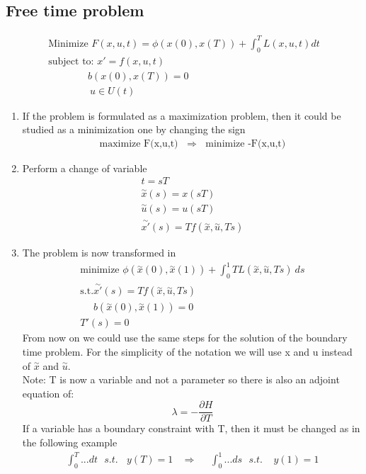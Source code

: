 \documentclass[a4paper,12pt]{article}
\begin{document}
	\subsection{Free time problem}
	\begin{gather*}
		\text{Minimize } F(x,u,t)=\phi(x(0),x(T))+\int_{0}^{T}L(x,u,t)dt\\
		\text{subject to: } x'=f(x,u,t)\\
		\ \ \ \ \ \ \ \ \ \ \ \ \ \ \ \ \ \ b(x(0),x(T))=0\\
		\ \ \ \ \ \ \ \ \ \ \ \ \ \ \ \ \ \ \ u \in U(t)
	\end{gather*}
	\begin{enumerate}
		\item If the problem is formulated as a maximization problem, then it could be studied as a minimization one by changing the sign
		\begin{gather*}
			\text{maximize F(x,u,t)} \ \ \ \  \Rightarrow \ \ \ \ \text{minimize -F(x,u,t)}
		\end{gather*}
		\item Perform a change of variable
		\begin{gather*}
			t=sT\\
			\stackrel{\sim}{x}(s)=x(sT)\\
			\stackrel{\sim}{u}(s)=u(sT)\\
			\stackrel{\sim}{x'}(s)=Tf(\stackrel{\sim}{x},\stackrel{\sim}{u},Ts)
		\end{gather*}
		\item The problem is now transformed in
		\begin{gather*}
			\text{minimize } \phi(\stackrel{\sim}{x}(0),\stackrel{\sim}{x}(1)) +\int_{0}^{1} T L(\stackrel{\sim}{x},\stackrel{\sim}{u},Ts) \ ds \\
			\text{s.t.} \stackrel{\sim}{x'}(s)=Tf(\stackrel{\sim}{x},\stackrel{\sim}{u},Ts) \\
			\ \ \ \ \ \ b(\stackrel{\sim}{x}(0),\stackrel{\sim}{x}(1))=0\\
			T'(s)=0
		\end{gather*}
		From now on we could use the same steps for the solution of the boundary time problem. For the simplicity of the notation we will use x and u instead of  $\stackrel{\sim}{x}$ and $\stackrel{\sim}{u}$. \\
		Note: T is now a variable and not a parameter so there is also an adjoint equation of:
		\begin{equation*}
			\lambda = -\frac{\partial H}{\partial T}
		\end{equation*}
		If a variable has a boundary constraint with T, then it must be changed as in the following example
		\begin{gather*}
			\int_{0}^{T}...dt \ \ \  s.t. \ \ \ \  y(T)=1 \ \ \ \ \Rightarrow \ \ \ \ \ \ 	\int_{0}^{1}...ds \ \ \  s.t. \ \ \ \ \ y(1)=1 
		\end{gather*}
	\end{enumerate}
\end{document}
